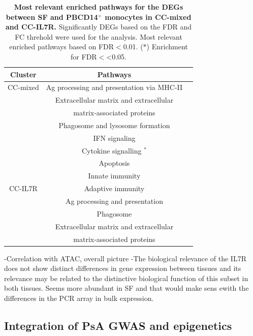 \begin{table}[htbp]
\centering
\begin{tabular}{@{} c c c}
\toprule
\textbf{Cluster} & \textbf{Pathways} \\
\midrule
\midrule
CC-mixed & Ag processing and presentation via MHC-II \\
				 & Extracellular matrix and extracellular \\
				 & matrix-associated proteins \\
				 & Phagosome and lysosome formation \\
				 & IFN signaling & \\
				 & Cytokine signalling $^\ast$ \\
				 & Apoptosis \\
				 & Innate immunity \\
\midrule				
CC-IL7R  & Adaptive immunity \\
         & Ag processing and presentation \\
				 & Phagosome \\
         & Extracellular matrix and extracellular \\
				 & matrix-associated proteins \\
\bottomrule
\end{tabular}
\medskip %
\caption[Most relevant enriched pathways for the DEGs between SF and PBCD14$^+$ monocytes in CC-mixed and CC-IL7R.]{\textbf{Most relevant enriched pathways for the DEGs between SF and PBCD14$^+$ monocytes in CC-mixed and CC-IL7R.} Significantly DEGs based on the FDR and FC threhold were used for the analysis. Most relevant enriched pathways based on FDR$<$0.01. ($\ast$) Enrichment for FDR$<$<0.05.}
\label{tab:PSA_scRNAseq_CD14_DEGs_pathway_analysis}
\end{table}



-Correlation with ATAC, overall picture
-The biological relevance of the IL7R does not show distinct differences in gene expression between tissues and its relevance may be related to the distinctive biological function of this subset in both tissues. Seems more abundant in SF and that would make sens ewith the differences in the PCR array in bulk expression.


\subsection{Integration of PsA GWAS and epigenetics}

